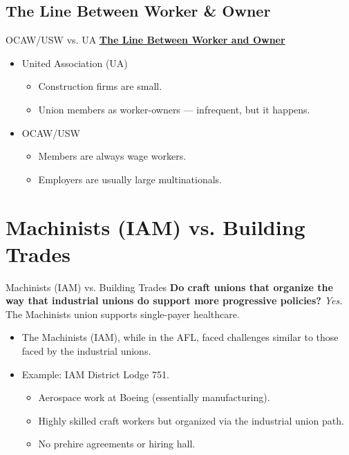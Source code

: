 \documentclass{beamer}
\begin{document}
\subsection*{The Line Between Worker \& Owner}
\begin{frame}{OCAW/USW vs. UA}
\underline{\textbf{The Line Between Worker and Owner}}
	\begin{itemize}
		\item United Association (UA)
		\begin{itemize}
			\item Construction firms are small.
			\item Union members as worker-owners — infrequent, but it happens.
		\end{itemize}
		\item OCAW/USW
			\begin{itemize}
				\item Members are always wage workers.
				\item Employers are usually large multinationals.
			\end{itemize}
	\end{itemize}
\end{frame}


\section{Machinists (IAM) vs. Building Trades}
\begin{frame}{Machinists (IAM) vs. Building Trades}
\textbf{Do craft unions that organize the way that industrial unions do support more progressive policies?}\newline\newline
\emph{Yes.} The Machinists union supports single-payer healthcare.
	\begin{itemize}
		\item The Machinists (IAM), while in the AFL, faced challenges similar to those faced by the industrial unions.
		\item Example: IAM District Lodge 751.
		\begin{itemize}
			\item Aerospace work at Boeing (essentially manufacturing).
			\item Highly skilled craft workers but organized via the industrial union path.
			\item No prehire agreements or hiring hall.
		\end{itemize}
	\end{itemize}
\end{frame}
\end{document}
